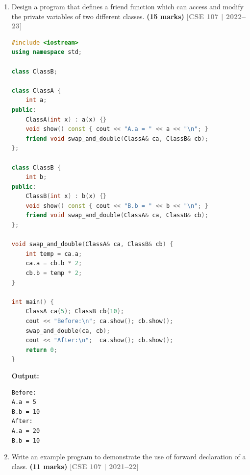 \documentclass[12pt,a3paper]{article}
\newcommand{\yr}[1]{\hfill\textcolor{gray}{\small\textbf{[#1]}}}
\newcommand{\mk}[1]{\textcolor{orange!70!black}{\small\textbf{(#1 marks)}}}
\begin{document}
\begin{enumerate}
\item Design a program that defines a friend function which can access and modify the private variables of two different classes. \mk{15}
\yr{CSE 107 | 2022--23}

\begin{tcolorbox}[enhanced,breakable,ansbox,colback=cD!4,colframe=cD,
  boxrule=0.8pt,arc=5pt,
  title={\textbf{Answer --- Friend function accesses and modifies two classes}},
  fonttitle=\bfseries\color{white},colbacktitle=cD]

\begin{lstlisting}[language=C++]
#include <iostream>
using namespace std;

class ClassB;

class ClassA {
    int a;
public:
    ClassA(int x) : a(x) {}
    void show() const { cout << "A.a = " << a << "\n"; }
    friend void swap_and_double(ClassA& ca, ClassB& cb);
};

class ClassB {
    int b;
public:
    ClassB(int x) : b(x) {}
    void show() const { cout << "B.b = " << b << "\n"; }
    friend void swap_and_double(ClassA& ca, ClassB& cb);
};

void swap_and_double(ClassA& ca, ClassB& cb) {
    int temp = ca.a;
    ca.a = cb.b * 2;
    cb.b = temp * 2;
}

int main() {
    ClassA ca(5); ClassB cb(10);
    cout << "Before:\n"; ca.show(); cb.show();
    swap_and_double(ca, cb);
    cout << "After:\n";  ca.show(); cb.show();
    return 0;
}
\end{lstlisting}

\textbf{Output:}
\begin{lstlisting}
Before:
A.a = 5
B.b = 10
After:
A.a = 20
B.b = 10
\end{lstlisting}

\end{tcolorbox}

\item Write an example program to demonstrate the use of forward declaration of a class. \mk{11}
\yr{CSE 107 | 2021--22}


\begin{tcolorbox}[enhanced,breakable,ansbox,colback=cD!4,colframe=cD,
  boxrule=0.8pt,arc=5pt,
  title={\textbf{Answer --- Forward declaration --- complete example}},
  fonttitle=\bfseries\color{white},colbacktitle=cD]


\end{tcolorbox}
\end{enumerate}
\end{document}
